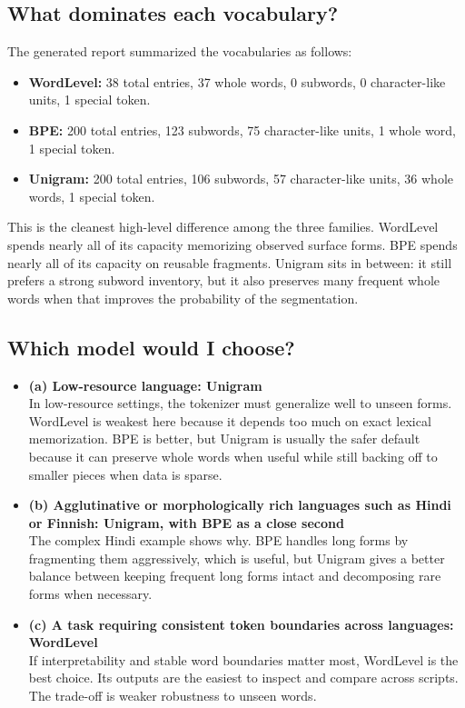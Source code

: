 \documentclass{article}
\begin{document}
\subsection{What dominates each vocabulary?}

The generated report summarized the vocabularies as follows:

\begin{itemize}
    \item \textbf{WordLevel:} 38 total entries, 37 whole words, 0 subwords, 0 character-like units, 1 special token.
    \item \textbf{BPE:} 200 total entries, 123 subwords, 75 character-like units, 1 whole word, 1 special token.
    \item \textbf{Unigram:} 200 total entries, 106 subwords, 57 character-like units, 36 whole words, 1 special token.
\end{itemize}

This is the cleanest high-level difference among the three families. WordLevel spends nearly all of its capacity memorizing observed surface forms. BPE spends nearly all of its capacity on reusable fragments. Unigram sits in between: it still prefers a strong subword inventory, but it also preserves many frequent whole words when that improves the probability of the segmentation.

\subsection{Which model would I choose?}

\begin{itemize}
    \item \textbf{(a) Low-resource language: Unigram} \\
    In low-resource settings, the tokenizer must generalize well to unseen forms. WordLevel is weakest here because it depends too much on exact lexical memorization. BPE is better, but Unigram is usually the safer default because it can preserve whole words when useful while still backing off to smaller pieces when data is sparse.

    \item \textbf{(b) Agglutinative or morphologically rich languages such as Hindi or Finnish: Unigram, with BPE as a close second} \\
    The complex Hindi example shows why. BPE handles long forms by fragmenting them aggressively, which is useful, but Unigram gives a better balance between keeping frequent long forms intact and decomposing rare forms when necessary.

    \item \textbf{(c) A task requiring consistent token boundaries across languages: WordLevel} \\
    If interpretability and stable word boundaries matter most, WordLevel is the best choice. Its outputs are the easiest to inspect and compare across scripts. The trade-off is weaker robustness to unseen words.
\end{itemize}
\end{document}

